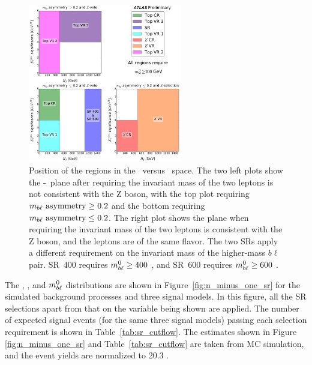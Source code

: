 \begin{figure}[ht]
  \centering
  \includegraphics[width=0.6\textwidth]{figs/blstop/regions__met_sig__ht_plane.pdf}
  \caption{Position of the regions in the \METSIG\ versus \HT\ space. The two
    left plots show the \METSIG-\HT~plane after requiring the invariant mass
    of the two leptons is not consistent with the Z boson, with the top plot
    requiring $m_{b\ell}~\mathrm{asymmetry} \geq 0.2$ and the bottom requiring $m_{b\ell}~\mathrm{asymmetry} \leq 0.2$.
    The right plot shows the plane when requiring the invariant mass of the
    two leptons is consistent with the Z boson, and the leptons are of the
    same flavor. The two SRs apply a different requirement on the
    invariant mass of the higher-mass $b\ell$ pair. SR~400 requires
    $m_{b\ell}^{0} \geq 400$ \GeV, and SR~600 requires $m_{b\ell}^{0} \geq 600$ \GeV.
  }
  \label{fig:region_coverage}
\end{figure}

The \HT, \MBLASYM, and $m_{b\ell}^0$ distributions are shown in
Figure~\ref{fig:n_minus_one_sr} for the simulated background processes
and three signal models.  In this figure, all the SR
selections apart from that on the variable being shown are applied.
The number of expected signal events (for the same three signal models)
passing each selection requirement is shown in Table~\ref{tab:sr_cutflow}.
The estimates shown in Figure \ref{fig:n_minus_one_sr} and
Table~\ref{tab:sr_cutflow} are taken from MC simulation, and the event
yields are normalized to 20.3 \ifb.

